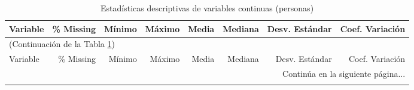\begin{longtable}{lrrrrrrr}
\caption{Estadísticas descriptivas de variables continuas (personas)} \label{tab:01_descriptiva_personas_continua} \\
\toprule
Variable & \% Missing & Mínimo & Máximo & Media & Mediana & Desv. Estándar & Coef. Variación \\
\midrule
\endfirsthead

\multicolumn{8}{l}{(Continuación de la Tabla \ref{tab:01_descriptiva_personas_continua})} \\
\toprule
Variable & \% Missing & Mínimo & Máximo & Media & Mediana & Desv. Estándar & Coef. Variación \\
\midrule
\endhead

\midrule
\multicolumn{8}{r}{Continúa en la siguiente página...} \\
\endfoot

\bottomrule
\endlastfoot


\end{longtable}
